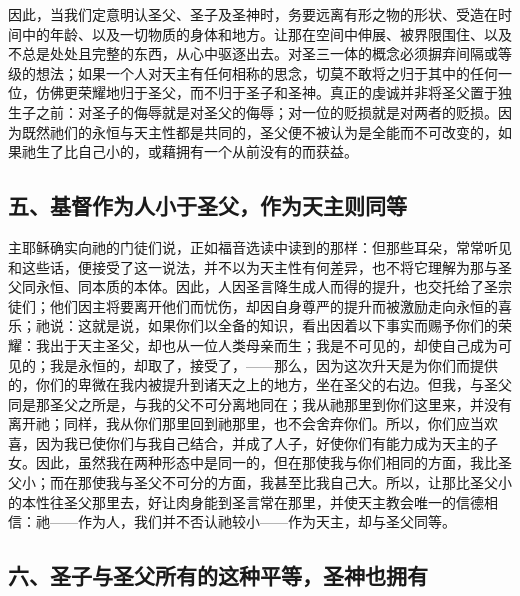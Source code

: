 因此，当我们定意明认圣父、圣子及圣神时，务要远离有形之物的形状、受造在时间中的年龄、以及一切物质的身体和地方。让那在空间中伸展、被界限围住、以及不总是处处且完整的东西，从心中驱逐出去。对圣三一体的概念必须摒弃间隔或等级的想法；如果一个人对天主有任何相称的思念，切莫不敢将之归于其中的任何一位，仿佛更荣耀地归于圣父，而不归于圣子和圣神。真正的虔诚并非将圣父置于独生子之前：对圣子的侮辱就是对圣父的侮辱；对一位的贬损就是对两者的贬损。因为既然祂们的永恒与天主性都是共同的，圣父便不被认为是全能而不可改变的，如果祂生了比自己小的，或藉拥有一个从前没有的而获益。\par


\subsection{五、基督作为人小于圣父，作为天主则同等}

主耶稣确实向祂的门徒们说，正如福音选读中读到的那样：但那些耳朵，常常听见和这些话，便接受了这一说法，并不以为天主性有何差异，也不将它理解为那与圣父同永恒、同本质的本体。因此，人因圣言降生成人而得的提升，也交托给了圣宗徒们；他们因主将要离开他们而忧伤，却因自身尊严的提升而被激励走向永恒的喜乐；祂说：这就是说，如果你们以全备的知识，看出因着以下事实而赐予你们的荣耀：我出于天主圣父，却也从一位人类母亲而生；我是不可见的，却使自己成为可见的；我是永恒的，却取了，接受了，——那么，因为这次升天是为你们而提供的，你们的卑微在我内被提升到诸天之上的地方，坐在圣父的右边。但我，与圣父同是那圣父之所是，与我的父不可分离地同在；我从祂那里到你们这里来，并没有离开祂；同样，我从你们那里回到祂那里，也不会舍弃你们。所以，你们应当欢喜，因为我已使你们与我自己结合，并成了人子，好使你们有能力成为天主的子女。因此，虽然我在两种形态中是同一的，但在那使我与你们相同的方面，我比圣父小；而在那使我与圣父不可分的方面，我甚至比我自己大。所以，让那比圣父小的本性往圣父那里去，好让肉身能到圣言常在那里，并使天主教会唯一的信德相信：祂——作为人，我们并不否认祂较小——作为天主，却与圣父同等。\par


\subsection{六、圣子与圣父所有的这种平等，圣神也拥有}

